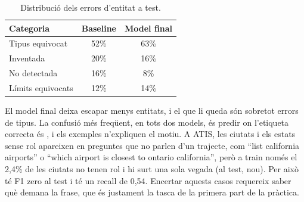 \begin{table}[ht]
\centering\small
\caption{Distribució dels errors d'entitat a test.}
\label{tab:errors}
\begin{tabular}{lcc}
\toprule
Categoria & Baseline & Model final \\
\midrule
Tipus equivocat    & 52\% & 63\% \\
Inventada          & 20\% & 16\% \\
No detectada       & 16\% & 8\% \\
Límits equivocats  & 12\% & 14\% \\
\bottomrule
\end{tabular}
\end{table}

El model final deixa escapar menys entitats, i el que li queda són sobretot errors de tipus. La confusió més
freqüent, en tots dos models, és predir  on l'etiqueta correcta és , i els
exemples n'expliquen el motiu. A ATIS, les ciutats i els estats sense rol apareixen en preguntes que no parlen d'un
trajecte, com ``list california airports'' o ``which airport is closest to ontario california'', però a train
només el 2,4\% de les ciutats no tenen rol i  hi surt una sola vegada (al test, nou). Per això
 té F1 zero al test i  té un recall de 0,54. Encertar aquests casos requereix
saber què demana la frase, que és justament la tasca de la primera part de la pràctica.

